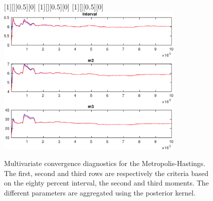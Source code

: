  
\begin{figure}[H]
[1][][0.5][0]{ }
[1][][0.5][0]{ }
[1][][0.5][0]{ }
\centering 
\includegraphics[width=0.8\textwidth]{KimModTheBuilder/Output/KimModTheBuilder_mdiag}
\caption{Multivariate convergence diagnostics for the Metropolis-Hastings.
The first, second and third rows are respectively the criteria based on
the eighty percent interval, the second and third moments. The different 
parameters are aggregated using the posterior kernel.}\label{Fig:MultivariateDiagnostics}
\end{figure}

